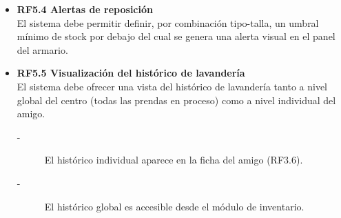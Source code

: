 \begin{itemize}
    \begin{itemize}
        \item \textbf{RF5.3.1 Decremento automático de stock} \\
        La entrega decrementa automáticamente la cantidad disponible de la
        combinación tipo-talla entregada en una unidad.
        \item \textbf{RF5.3.2 Reglas de frecuencia configurables} \\
        El sistema debe aplicar reglas de frecuencia configurables que limiten
        la entrega repetida del mismo tipo de prenda al mismo amigo en un
        periodo dado.
        \begin{description}
            \item[-] Caso paradigmático: una unidad de calzado por amigo cada 3 meses.
            \item[-] Si la regla se incumple, el sistema avisa al voluntario y exige justificación o aprobación de un Admin.
            \item[-] Las excepciones quedan registradas en el log de auditoría. 
        \end{description}
        \item \textbf{RF5.3.3 Integridad ante stock insuficiente} \\
        El sistema debe impedir la entrega de una prenda cuya cantidad disponible es cero. 
        Ni siquiera debe mostrarse como opción seleccionable en el proceso de entrega.
    \end{itemize}

    \item \textbf{RF5.4 Alertas de reposición} \\
    El sistema debe permitir definir, por combinación tipo-talla, un umbral
    mínimo de stock por debajo del cual se genera una alerta visual en el
    panel del armario.

    \item \textbf{RF5.5 Visualización del histórico de lavandería} \\
    El sistema debe ofrecer una vista del histórico de lavandería tanto a
    nivel global del centro (todas las prendas en proceso) como a nivel
    individual del amigo.
    \begin{description}
        \item[-] El histórico individual aparece en la ficha del amigo (RF3.6).
        \item[-] El histórico global es accesible desde el módulo de inventario.
    \end{description}
\end{itemize}




